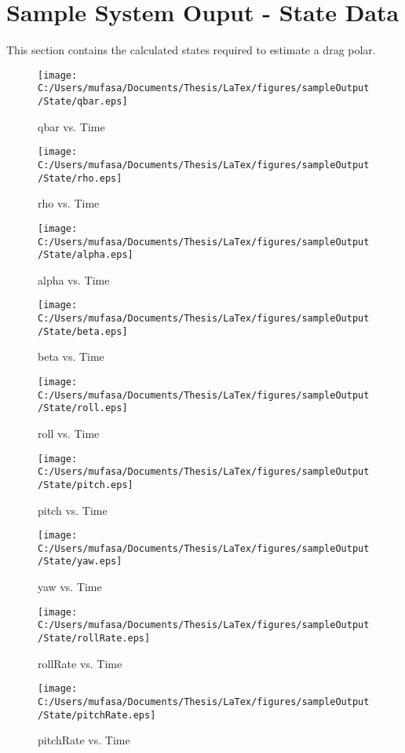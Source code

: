 \section{Sample System Ouput - State Data}
This section contains the calculated states required to estimate a drag polar.
\begin{figure}[]
	\centering
	\caption{qbar vs. Time}
		\texttt{[image: C:/Users/mufasa/Documents/Thesis/LaTex/figures/sampleOutput/State/qbar.eps]}
\end{figure}
\begin{figure}[]
	\centering
	\caption{rho vs. Time}
		\texttt{[image: C:/Users/mufasa/Documents/Thesis/LaTex/figures/sampleOutput/State/rho.eps]}
\end{figure}
\clearpage
\begin{figure}[]
	\centering
	\caption{alpha vs. Time}
		\texttt{[image: C:/Users/mufasa/Documents/Thesis/LaTex/figures/sampleOutput/State/alpha.eps]}
\end{figure}
\begin{figure}[]
	\centering
	\caption{beta vs. Time}
		\texttt{[image: C:/Users/mufasa/Documents/Thesis/LaTex/figures/sampleOutput/State/beta.eps]}
\end{figure}
\begin{figure}[]
	\centering
	\caption{roll vs. Time}
		\texttt{[image: C:/Users/mufasa/Documents/Thesis/LaTex/figures/sampleOutput/State/roll.eps]}
\end{figure}
\begin{figure}[]
	\centering
	\caption{pitch vs. Time}
		\texttt{[image: C:/Users/mufasa/Documents/Thesis/LaTex/figures/sampleOutput/State/pitch.eps]}
\end{figure}
\begin{figure}[]
	\centering
	\caption{yaw vs. Time}
		\texttt{[image: C:/Users/mufasa/Documents/Thesis/LaTex/figures/sampleOutput/State/yaw.eps]}
\end{figure}
\begin{figure}[]
	\centering
	\caption{rollRate vs. Time}
		\texttt{[image: C:/Users/mufasa/Documents/Thesis/LaTex/figures/sampleOutput/State/rollRate.eps]}
\end{figure}
\begin{figure}[]
	\centering
	\caption{pitchRate vs. Time}
		\texttt{[image: C:/Users/mufasa/Documents/Thesis/LaTex/figures/sampleOutput/State/pitchRate.eps]}
\end{figure}
